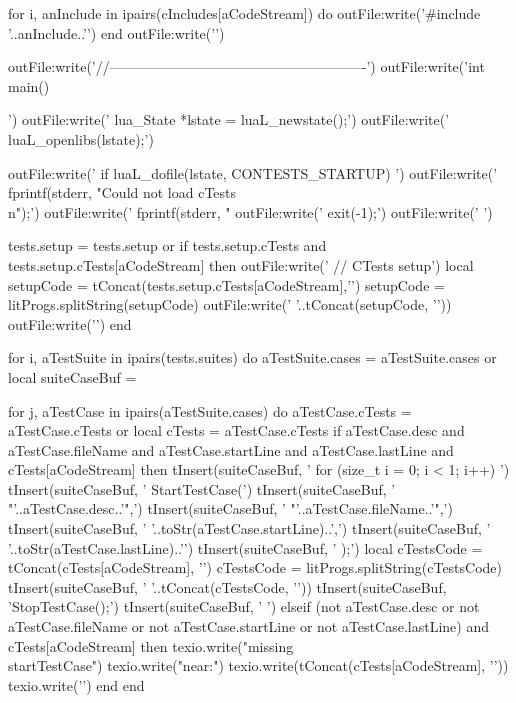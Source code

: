   for i, anInclude in ipairs(cIncludes[aCodeStream]) do
    outFile:write('#include '..anInclude..'\n')
  end
  outFile:write('\n\n')

  outFile:write('//-------------------------------------------------------\n')
  outFile:write('int main(){\n\n')
  outFile:write('  lua_State *lstate = luaL_newstate();\n')
  outFile:write('  luaL_openlibs(lstate);\n\n')

  outFile:write('  if luaL_dofile(lstate, CONTESTS_STARTUP) {\n')
  outFile:write('    fprintf(stderr, "Could not load cTests\\n");\n')
  outFile:write('    fprintf(stderr, "%
  outFile:write('    exit(-1);\n')
  outFile:write('  }\n\n')

  tests.setup = tests.setup or { }
  if tests.setup.cTests and
    tests.setup.cTests[aCodeStream] then
    outFile:write('  // CTests setup\n')
    local setupCode = tConcat(tests.setup.cTests[aCodeStream],'\n')
    setupCode       = litProgs.splitString(setupCode)
    outFile:write('  '..tConcat(setupCode, '\n  '))
    outFile:write('\n\n')
  end

  for i, aTestSuite in ipairs(tests.suites) do
    aTestSuite.cases = aTestSuite.cases or { }
    local suiteCaseBuf = { }

    for j, aTestCase in ipairs(aTestSuite.cases) do
      aTestCase.cTests = aTestCase.cTests or { }
      local cTests     = aTestCase.cTests
      if aTestCase.desc and
        aTestCase.fileName and
        aTestCase.startLine and
        aTestCase.lastLine and
        cTests[aCodeStream] then
        tInsert(suiteCaseBuf, '    for (size_t i = 0; i < 1; i++) {\n\n')
        tInsert(suiteCaseBuf, '      StartTestCase(\n')
        tInsert(suiteCaseBuf, '        "'..aTestCase.desc..'",\n')
        tInsert(suiteCaseBuf, '        "'..aTestCase.fileName..'",\n')
        tInsert(suiteCaseBuf, '        '..toStr(aTestCase.startLine)..',\n')
        tInsert(suiteCaseBuf, '        '..toStr(aTestCase.lastLine)..'\n')
        tInsert(suiteCaseBuf, '      );\n\n  ')
        local cTestsCode = tConcat(cTests[aCodeStream], '\n')
        cTestsCode       = litProgs.splitString(cTestsCode)
        tInsert(suiteCaseBuf, '    '..tConcat(cTestsCode, '\n      '))
        tInsert(suiteCaseBuf, '\n\n      StopTestCase();\n\n')
        tInsert(suiteCaseBuf, '    }\n\n')
      elseif (not aTestCase.desc or
        not aTestCase.fileName or
        not aTestCase.startLine or
        not aTestCase.lastLine) and
        cTests[aCodeStream] then
        texio.write("\nERROR missing \\startTestCase\n")
        texio.write("near:\n")
        texio.write(tConcat(cTests[aCodeStream], '\n'))
        texio.write('\n')
      end
    end

}
